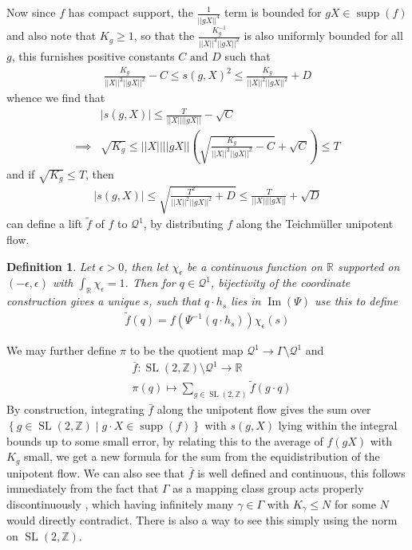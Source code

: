 \documentclass{article}
\newtheorem{defn}{Definition}
\newcommand{\set}[1]{\left\{#1\right\}}
\newcommand{\abs}[1]{\left\vert#1\right\vert}
\newcommand{\norm}[1]{\lvert\lvert#1\rvert\rvert}
\newcommand{\tand}{\text{ and }}
\newcommand{\slz}{\operatorname{SL}(2,\mathbb{Z})}
\begin{document}
        Now since \(f\) has compact support, the \(\frac{1}{\norm{g X}^4}\) term is bounded for \(g X \in \operatorname{supp}(f)\) and also note that \(K_g \geq 1\), so that the \(\frac{K_g^{-1}}{\norm{X}^2\norm{g X}^2}\) is also uniformly bounded for all \(g\), this furnishes positive constants \(C \tand D\) such that
        \begin{align*}
            \frac{K_g}{\norm{X}^2\norm{g X}^2} - C \leq s(g,X)^2 \leq \frac{K_g}{\norm{X}^2\norm{g X}^2} + D
        \end{align*}
        whence we find that
        \begin{align*}
            &\abs{s(g,X)} \leq \frac{T}{\norm{X}\norm{g X}} - \sqrt{C} \\
            \implies & \sqrt{K_g} \leq \norm{X}\norm{g X}\left(\sqrt{\frac{K_g}{\norm{X}^2\norm{g X}^2} - C} + \sqrt{C}\right) \leq T
        \end{align*}
        and if \(\sqrt{K_g} \leq T\), then
        \begin{align*}
            \abs{s(g,X)} \leq \sqrt{\frac{T^2}{\norm{X}^2\norm{g X}^2} + D} \leq \frac{T}{\norm{X}\norm{g X}} + \sqrt{D}
        \end{align*}
        can define a lift \(\tilde{f}\) of \(f\) to \(\mathcal{Q}^1\), by distributing \(f\) along the Teichm\"uller unipotent flow.
        \begin{defn}
            Let \(\epsilon > 0\), then let \(\chi_\epsilon\) be a continuous function on \(\mathbb{R}\) supported on \((-\epsilon,\epsilon)\) with \(\int_\mathbb{R} \chi_\epsilon = 1\). Then for \(q \in \mathcal{Q}^1\), bijectivity of the coordinate construction gives a unique \(s\), such that \(q \cdot h_s\) lies in \(\operatorname{Im}(\Psi)\) use this to define
            \begin{align*}
                \tilde{f}(q) = f(\Psi^{-1}(q\cdot h_s))\chi_\epsilon(s)
            \end{align*}
        \end{defn}
        We may further define \(\pi\) to be the quotient map \(\mathcal{Q}^1 \to \Gamma \setminus \mathcal{Q}^1\) and
        \begin{align*}
            &\overline{f}: \slz \setminus \mathcal{Q}^1 \to \mathbb{R} \\
            &\pi(q) \mapsto \sum_{g \in \slz} \tilde{f}(g \cdot q)
        \end{align*}
        By construction, integrating \(\bar{f}\) along the unipotent flow gives the sum over \(\set{g \in \slz \mid g \cdot X \in \operatorname{supp}(f)}\) with \(s(g,X)\) lying within the integral bounds up to some small error, by relating this to the average of \(f(g X)\) with \(K_g\) small, we get a new formula for the sum from the equidistribution of the unipotent flow. We can also see that \(\overline{f}\) is well defined and continuous, this follows immediately from the fact that \(\Gamma\) as a mapping class group acts properly discontinuously \cite{FarbMarg}, which having infinitely many \(\gamma \in \Gamma\) with \(K_\gamma \leq N\) for some \(N\) would directly contradict. There is also a way to see this simply using the norm on \(\slz\).
\end{document}
